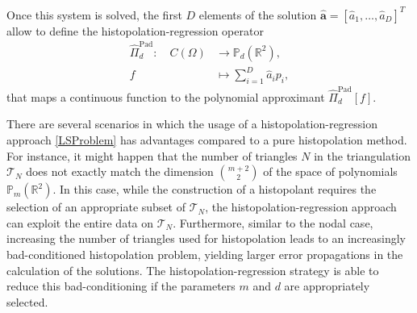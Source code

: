 \documentclass{svjour3}
\renewcommand{\P}{\mathbb{P}} %
\begin{document}
Once this system is solved, the first $ D $ elements of the solution  $\hat{\boldsymbol{a}}=\left[\hat{a}_1,\dots,\hat{a}_D \right]^T$ allow to define the histopolation-regression operator
\begin{align}\label{operatorPhat}
\hat{\Pi}_d^{\mathrm{Pad}} : \quad C (\Omega) & \to \P_d\left(\mathbb{R}^2\right), \\ \nonumber
	f & \mapsto \sum_{i=1}^D \hat{a}_i p_i,
\end{align}
that maps a continuous function to the polynomial approximant $\hat{\Pi}_d^{\mathrm{Pad}}[f]$.

\begin{remark}
   There are several scenarios in which the usage of a histopolation-regression approach \eqref{LSProblem} has advantages compared to a pure histopolation method. For instance, it might happen that the number of triangles $N$ in the triangulation $\mathcal{T}_N$ does not exactly match the dimension $\binom{m+2}{2}$ of the space of polynomials $ \P_m\left(\mathbb{R}^2\right) $. In this case, while the construction of a histopolant requires the selection of an appropriate subset of $\mathcal{T}_N$, the histopolation-regression approach can exploit the entire data on $\mathcal{T}_N$. Furthermore, similar to the nodal case, increasing the number of triangles used for histopolation leads to an increasingly bad-conditioned histopolation problem, yielding larger error propagations in the calculation of the solutions. The histopolation-regression strategy is able to reduce this bad-conditioning if the parameters $m$ and $d$ are appropriately selected.
\end{remark}
\end{document}

